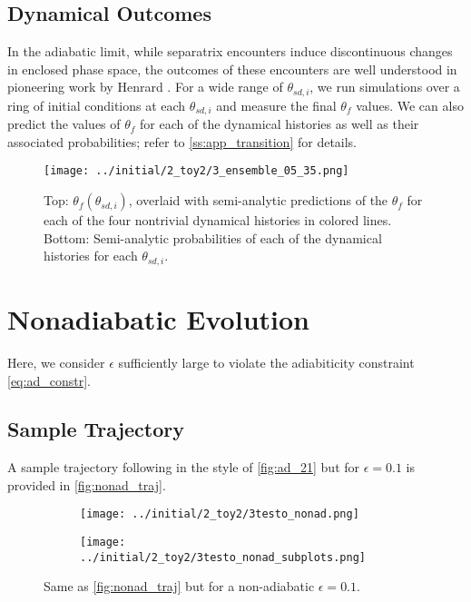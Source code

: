 \documentclass[
        fleqn,
        usenatbib,
    ]{mnras}
\newcommand*{\p}[1]{\left(#1\right)}
\begin{document}
\subsection{Dynamical Outcomes}\label{ss:ad_ensemble}

In the adiabatic limit, while separatrix encounters induce discontinuous changes
in enclosed phase space, the outcomes of these encounters are well understood in
pioneering work by Henrard \citep{henrard1982,henrard1987}. For a wide range of
$\theta_{sd, i}$, we run simulations over a ring of initial conditions at each
$\theta_{sd, i}$ and measure the final $\theta_{ f}$ values. We can also
predict the values of $\theta_{ f}$ for each of the dynamical histories as
well as their associated probabilities; refer to \autoref{ss:app_transition} for
details.
\begin{figure}
    \centering
    \texttt{[image: ../initial/2\_toy2/3\_ensemble\_05\_35.png]}
    \caption{Top: $\theta_{f}\p{\theta_{sd, i}}$, overlaid with semi-analytic
    predictions of the $\theta_{ f}$ for each of the four nontrivial
    dynamical histories in colored lines. Bottom: Semi-analytic probabilities of
    each of the dynamical histories for each $\theta_{sd,
    i}$.}\label{fig:ad_ensemble}
\end{figure}

\section{Nonadiabatic Evolution}\label{s:nonad}

Here, we consider $\epsilon$ sufficiently large to violate the adiabiticity
constraint \autoref{eq:ad_constr}.

\subsection{Sample Trajectory}

A sample trajectory following in the style of \autoref{fig:ad_21} but for
$\epsilon = 0.1$ is provided in \autoref{fig:nonad_traj}.
\begin{figure}
    \centering
    \begin{subfigure}{\columnwidth}
        \centering
        \texttt{[image: ../initial/2\_toy2/3testo\_nonad.png]}
    \end{subfigure}
    \begin{subfigure}{\columnwidth}
        \centering
        \texttt{[image: ../initial/2\_toy2/3testo\_nonad\_subplots.png]}
    \end{subfigure}
    \caption{Same as \autoref{fig:nonad_traj} but for a non-adiabatic $\epsilon =
    0.1$.}\label{fig:nonad_traj}
\end{figure}
\end{document}
